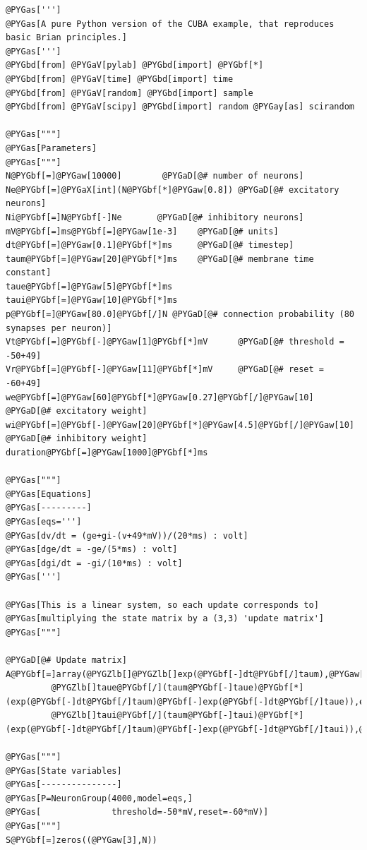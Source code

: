 \documentclass[letterpaper,10pt,english]{manual}
\begin{document}
\begin{Verbatim}[commandchars=@\[\]]
@PYGas[''']
@PYGas[A pure Python version of the CUBA example, that reproduces basic Brian principles.]
@PYGas[''']
@PYGbd[from] @PYGaV[pylab] @PYGbd[import] @PYGbf[*]
@PYGbd[from] @PYGaV[time] @PYGbd[import] time
@PYGbd[from] @PYGaV[random] @PYGbd[import] sample
@PYGbd[from] @PYGaV[scipy] @PYGbd[import] random @PYGay[as] scirandom

@PYGas["""]
@PYGas[Parameters]
@PYGas["""]
N@PYGbf[=]@PYGaw[10000]        @PYGaD[@# number of neurons]
Ne@PYGbf[=]@PYGaX[int](N@PYGbf[*]@PYGaw[0.8]) @PYGaD[@# excitatory neurons]
Ni@PYGbf[=]N@PYGbf[-]Ne       @PYGaD[@# inhibitory neurons]
mV@PYGbf[=]ms@PYGbf[=]@PYGaw[1e-3]    @PYGaD[@# units]
dt@PYGbf[=]@PYGaw[0.1]@PYGbf[*]ms     @PYGaD[@# timestep]
taum@PYGbf[=]@PYGaw[20]@PYGbf[*]ms    @PYGaD[@# membrane time constant]
taue@PYGbf[=]@PYGaw[5]@PYGbf[*]ms
taui@PYGbf[=]@PYGaw[10]@PYGbf[*]ms
p@PYGbf[=]@PYGaw[80.0]@PYGbf[/]N @PYGaD[@# connection probability (80 synapses per neuron)]
Vt@PYGbf[=]@PYGbf[-]@PYGaw[1]@PYGbf[*]mV      @PYGaD[@# threshold = -50+49]
Vr@PYGbf[=]@PYGbf[-]@PYGaw[11]@PYGbf[*]mV     @PYGaD[@# reset = -60+49]
we@PYGbf[=]@PYGaw[60]@PYGbf[*]@PYGaw[0.27]@PYGbf[/]@PYGaw[10] @PYGaD[@# excitatory weight]
wi@PYGbf[=]@PYGbf[-]@PYGaw[20]@PYGbf[*]@PYGaw[4.5]@PYGbf[/]@PYGaw[10] @PYGaD[@# inhibitory weight]
duration@PYGbf[=]@PYGaw[1000]@PYGbf[*]ms

@PYGas["""]
@PYGas[Equations]
@PYGas[---------]
@PYGas[eqs=''']
@PYGas[dv/dt = (ge+gi-(v+49*mV))/(20*ms) : volt]
@PYGas[dge/dt = -ge/(5*ms) : volt]
@PYGas[dgi/dt = -gi/(10*ms) : volt]
@PYGas[''']

@PYGas[This is a linear system, so each update corresponds to]
@PYGas[multiplying the state matrix by a (3,3) 'update matrix']
@PYGas["""]

@PYGaD[@# Update matrix]
A@PYGbf[=]array(@PYGZlb[]@PYGZlb[]exp(@PYGbf[-]dt@PYGbf[/]taum),@PYGaw[0],@PYGaw[0]@PYGZrb[],
         @PYGZlb[]taue@PYGbf[/](taum@PYGbf[-]taue)@PYGbf[*](exp(@PYGbf[-]dt@PYGbf[/]taum)@PYGbf[-]exp(@PYGbf[-]dt@PYGbf[/]taue)),exp(@PYGbf[-]dt@PYGbf[/]taue),@PYGaw[0]@PYGZrb[],
         @PYGZlb[]taui@PYGbf[/](taum@PYGbf[-]taui)@PYGbf[*](exp(@PYGbf[-]dt@PYGbf[/]taum)@PYGbf[-]exp(@PYGbf[-]dt@PYGbf[/]taui)),@PYGaw[0],exp(@PYGbf[-]dt@PYGbf[/]taui)@PYGZrb[]@PYGZrb[])@PYGbf[.]T

@PYGas["""]
@PYGas[State variables]
@PYGas[---------------]
@PYGas[P=NeuronGroup(4000,model=eqs,]
@PYGas[              threshold=-50*mV,reset=-60*mV)]
@PYGas["""]
S@PYGbf[=]zeros((@PYGaw[3],N))


\end{Verbatim}
\end{document}
